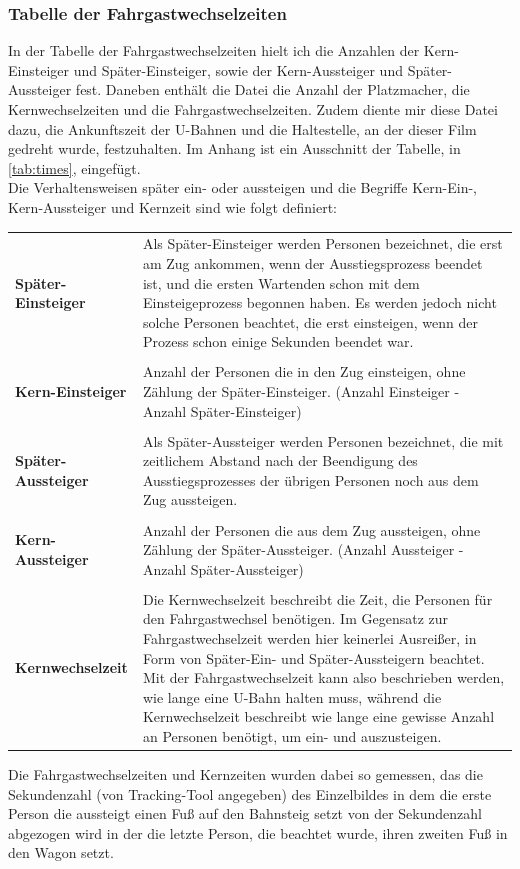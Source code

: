 \subsubsection{Tabelle der Fahrgastwechselzeiten} \label{Zeiten Tabelle}
In der Tabelle der Fahrgastwechselzeiten hielt ich die Anzahlen der Kern-Einsteiger und Später-Einsteiger, sowie der Kern-Aussteiger und Später-Aussteiger fest. Daneben enthält die Datei die Anzahl der Platzmacher, die Kernwechselzeiten und die Fahrgastwechselzeiten.
Zudem diente mir diese Datei dazu, die Ankunftszeit der U-Bahnen und die Haltestelle, an der dieser Film gedreht wurde, festzuhalten. Im Anhang ist ein Ausschnitt der Tabelle, in \tablename \ref{tab:times}, eingefügt. \\
Die Verhaltensweisen später ein- oder aussteigen und die Begriffe Kern-Ein-, Kern-Aussteiger und Kernzeit sind wie folgt definiert:
\begin{longtable}{l p{10.5 cm}}
	\centering
			\textbf{Später-Einsteiger} & Als Später-Einsteiger werden Personen bezeichnet, die erst am Zug ankommen, wenn der Ausstiegsprozess beendet ist, und die ersten Wartenden schon mit dem Einsteigeprozess begonnen haben. Es werden jedoch nicht solche Personen beachtet, die erst einsteigen, wenn der Prozess schon einige Sekunden beendet war.\\
			 & \\
			\textbf{Kern-Einsteiger} & Anzahl der Personen die in den Zug einsteigen, ohne Zählung der Später-Einsteiger. (Anzahl Einsteiger - Anzahl Später-Einsteiger) \\
			 & \\
			 \textbf{Später-Aussteiger} & Als Später-Aussteiger werden Personen bezeichnet, die mit zeitlichem Abstand nach der Beendigung des Ausstiegsprozesses der übrigen Personen noch aus dem Zug aussteigen.\\
			 & \\
			\textbf{Kern-Aussteiger} & Anzahl der Personen die aus dem Zug aussteigen, ohne Zählung der Später-Aussteiger. (Anzahl Aussteiger - Anzahl Später-Aussteiger)\\
			 & \\
			 \textbf{Kernwechselzeit} & Die Kernwechselzeit beschreibt die Zeit, die Personen für den Fahrgastwechsel benötigen. Im Gegensatz zur Fahrgastwechselzeit werden hier keinerlei Ausreißer, in Form von Später-Ein- und Später-Aussteigern beachtet. Mit der Fahrgastwechselzeit kann also beschrieben werden, wie lange eine U-Bahn halten muss, während die Kernwechselzeit beschreibt wie lange eine gewisse Anzahl an Personen benötigt, um ein- und auszusteigen.
\end{longtable}
Die Fahrgastwechselzeiten und Kernzeiten wurden dabei so gemessen, das die Sekundenzahl (von Tracking-Tool angegeben) des Einzelbildes in dem die erste Person die aussteigt einen Fuß auf den Bahnsteig setzt von der Sekundenzahl abgezogen wird in der die letzte Person, die beachtet wurde, ihren zweiten Fuß in den Wagon setzt.

